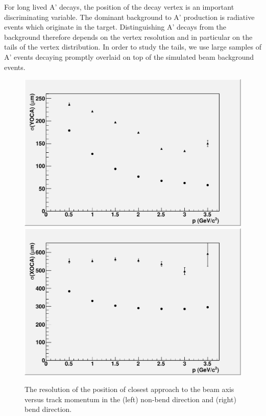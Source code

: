 For long lived A' decays, the position of the decay vertex is an important discriminating 
variable.  The dominant background to A' production is radiative events which originate 
in the target. Distinguishing A' decays from the background therefore depends on the vertex 
resolution and in particular on the tails of the vertex distribution. In order to study 
the tails, we use large samples of A' events decaying promptly overlaid on top of the 
simulated beam background events.
   
\begin{figure}
\includegraphics[scale=0.4]{performance/tracking_performance/yoca-MomResolution.pdf}
\includegraphics[scale=0.4]{performance/tracking_performance/xoca-MomResolution.pdf}
\caption{The resolution of the position of closest approach to the beam axis 
versus track momentum in the (left) non-bend direction and (right) bend direction.}
 \label{fig:doca}
\end{figure}

